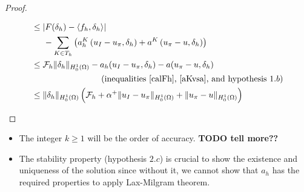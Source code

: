 \begin{proof}
\begin{enumerate}
\begin{align*}
&\leq |F(\delta_h) - \langle f_h, \delta_h \rangle| \\
&\hspace{0.5cm} - \sum_{K\in T_h}\left( a_h^K\left( u_I-u_\pi,\delta_h \right) + a^K\left( u_\pi-u, \delta_h \right) \right)\\
&\leq \mathcal{F}_h\|\delta_h\|_{H_0^1(\Omega)}-a_h(u_I-u_\pi,\delta_h)-a(u_\pi-u,\delta_h)\\
&\hspace{2.9cm} \text{(inequalities \ref{calFh}, \ref{aKvsa}, and hypothesis }1.b)\\
&\leq  \|\delta_h\|_{H_0^1(\Omega)} \left (\mathcal{F}_h + \alpha^+\|u_I-u_\pi\|_{H_0^1(\Omega)} + \|u_\pi-u\|_{H_0^1(\Omega)} \right)
\end{align*}

\end{enumerate}
\end{proof}

\begin{remark}
\begin{itemize} A few remarks on the theorem:
\item The integer $k\geq 1$ will be the order of accuracy. \textbf{TODO tell more??}
\item The stability property (hypothesis $2.c$) is crucial to show the existence and uniqueness of the solution since without it, we cannot show that $a_h$ has the required properties to apply Lax-Milgram theorem.
\end{itemize}
\end{remark}